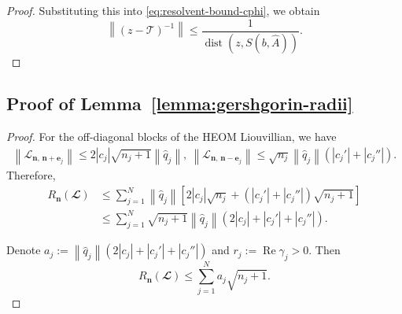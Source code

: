 \documentclass{SciPost}
\renewcommand{\Re}{\operatorname{Re}}
\begin{document}
\begin{proof}
    Substituting this into \eqref{eq:resolvent-bound-cphi}, we obtain
    \begin{equation}
        \left\|
        (z-\mathcal T)^{-1}
        \right\|
        \leqslant
        \frac{1}{
            \operatorname{dist}\left(
                z,
                S(b,\hat A)
            \right)
        }.
    \end{equation}
\end{proof}

\subsection{Proof of Lemma~\ref{lemma:gershgorin-radii}}
\label{sec:lemma-gershgorin-radii-proof}
\begin{proof}
    For the off-diagonal blocks of the HEOM Liouvillian, we have
    \begin{equation}
        \begin{aligned}
            \left \| \mathcal L_{\bm n,\, \bm n + \bm e_j} \right \|
            \leqslant
            2 |c_j| \sqrt{n_j + 1}\left \| \hat q_j \right \|,~ 
            \left \| \mathcal L_{\bm n,\, \bm n - \bm e_j} \right \|
            \leqslant
            \sqrt{n_j}\left \| \hat q_j \right \|
            \left(
                |c_j'| + |c_j''|
            \right).
        \end{aligned}
    \end{equation}
    Therefore,
    \begin{equation}
        \begin{aligned}
            R_{\bm n}(\mathbfcal L)
            &\leqslant
            \sum\limits_{j=1}^N
            \left \| \hat q_j \right \|
            \left[
                2 |c_j| \sqrt{n_j}
                +
                \left(
                    |c_j'| + |c_j''|
                \right)\sqrt{n_j + 1}
            \right] \\
            &\leqslant
            \sum\limits_{j=1}^N
            \sqrt{n_j + 1}
            \left \| \hat q_j \right \|
            \left(
                2 |c_j| + |c_j'| + |c_j''|
            \right).
        \end{aligned}
    \end{equation}

    Denote $a_j
        :=
        \left \| \hat q_j \right \|
        \left(
            2 |c_j| + |c_j'| + |c_j''|
        \right)
    $ and $r_j := \Re \gamma_j > 0$. Then
    \begin{equation}
        R_{\bm n}(\mathbfcal L)
        \leqslant
        \sum\limits_{j=1}^N a_j \sqrt{n_j + 1}.
    \end{equation}


\end{proof}
\end{document}
